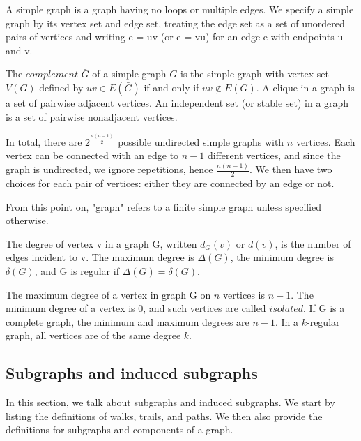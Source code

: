 \begin{definition}
\label{def:simple_graph}
A simple graph is a graph having no loops or multiple edges. We specify a simple graph by its vertex set and edge set, treating the edge set as a set of unordered pairs of vertices and writing e = uv (or e = vu) for an edge e with endpoints u and v.
\end{definition}

\begin{definition}
The $complement$ $\bar{G}$ of a simple graph $G$ is the simple graph with vertex set $V(G)$ defined by $uv \in E(\bar{G})$ if and only if $uv \notin E(G)$. A clique in a graph is a set of pairwise adjacent vertices. An independent set (or stable set) in a graph is a set of pairwise nonadjacent vertices.
\end{definition}

In total, there are $2^{\frac{n(n-1)}{2}}$ possible undirected simple graphs with $n$ vertices. Each vertex can be connected with an edge to $n-1$ different vertices, and since the graph is undirected, we ignore repetitions, hence $\frac{n(n-1)}{2}$. We then have two choices for each pair of vertices: either they are connected by an edge or not.

From this point on, "graph" refers to a finite simple graph unless specified otherwise.

\begin{definition}
\label{def:degree}
The degree of vertex v in a graph G, written $d_G(v)$ or $d(v)$, is the number of edges incident to v. The maximum degree is $\Delta(G)$, the minimum degree is $\delta(G)$, and G is regular if $\Delta(G) = \delta(G)$.
\end{definition}

The maximum degree of a vertex in graph G on $n$ vertices is $n - 1$. The minimum degree of a vertex is 0, and such vertices are called $isolated$. If G is a complete graph, the minimum and maximum degrees are $n - 1$. In a $k$-regular graph, all vertices are of the same degree $k$.

\subsection{Subgraphs and induced subgraphs}

In this section, we talk about subgraphs and induced subgraphs. We start by listing the definitions of walks, trails, and paths. We then also provide the definitions for subgraphs and components of a graph.

